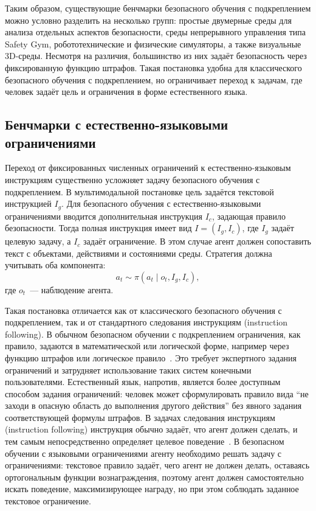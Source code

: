 Таким образом, существующие бенчмарки безопасного обучения с подкреплением можно условно разделить на несколько групп: простые двумерные среды для анализа отдельных аспектов безопасности, среды непрерывного управления типа Safety Gym, робототехнические и физические симуляторы, а также визуальные 3D-среды. Несмотря на различия, большинство из них задаёт безопасность через фиксированную функцию штрафов. Такая постановка удобна для классического безопасного обучения с подкреплением, но ограничивает переход к задачам, где человек задаёт цель и ограничения в форме естественного языка.

\subsection{Бенчмарки с естественно-языковыми ограничениями}
\label{subsec:language_safe_rl_benchmarks}

Переход от фиксированных численных ограничений к естественно-языковым инструкциям существенно усложняет задачу безопасного обучения с подкреплением. В мультимодальной постановке цель задаётся текстовой инструкцией $I_g$. Для безопасного обучения с естественно-языковыми ограничениями вводится дополнительная инструкция $I_c$, задающая правило безопасности. Тогда полная инструкция имеет вид $I=(I_g,I_c)$, где $I_g$ задаёт целевую задачу, а $I_c$ задаёт ограничение. В этом случае агент должен сопоставить текст с объектами, действиями и состояниями среды. Стратегия должна учитывать оба компонента:
\begin{equation}
a_t \sim \pi(a_t \mid o_t, I_g, I_c),
\end{equation}
где $o_t$~--- наблюдение агента.

Такая постановка отличается как от классического безопасного обучения с подкреплением, так и от стандартного следования инструкциям (instruction following). В обычном безопасном обучении с подкреплением ограничения, как правило, задаются в математической или логической форме, например через функцию штрафов или логическое правило~\cite{howard2014natural,wang2020ltl}. Это требует экспертного задания ограничений и затрудняет использование таких систем конечными пользователями. Естественный язык, напротив, является более доступным способом задания ограничений: человек может сформулировать правило вида ``не заходи в опасную область до выполнения другого действия'' без явного задания соответствующей формулы штрафов. В задачах следования инструкциям (instruction following) инструкция обычно задаёт, что агент должен сделать, и тем самым непосредственно определяет целевое поведение~\cite{macmahon2006walk,chen2011learning,artzi2013weakly,misra2017mapping,tellex2011understanding,andreas2015alignment}. В безопасном обучении с языковыми ограничениями агенту необходимо решать задачу с ограничениями: текстовое правило задаёт, чего агент не должен делать, оставаясь ортогональным функции вознаграждения, поэтому агент должен самостоятельно искать поведение, максимизирующее награду, но при этом соблюдать заданное текстовое ограничение.

